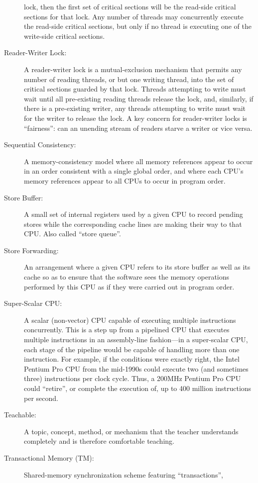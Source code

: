 \begin{description}
	lock, then the first set of critical sections will be the
	read-side critical sections for that lock.
	Any number of threads may concurrently execute the read-side
	critical sections, but only if no thread is executing one of
	the write-side critical sections.
\item[Reader-Writer Lock:]
	A reader-writer lock is a mutual-exclusion mechanism that
	permits any number of reading
	threads, or but one writing thread, into the set of critical
	sections guarded by that lock.
	Threads attempting to write must wait until all pre-existing
	reading threads release the lock, and, similarly, if there
	is a pre-existing writer, any threads attempting to write must
	wait for the writer to release the lock.
	A key concern for reader-writer locks is ``fairness'':
	can an unending stream of readers starve a writer or vice versa.
\item[Sequential Consistency:]
	A memory-consistency model where all memory references appear to occur
	in an order consistent with
	a single global order, and where each CPU's memory references
	appear to all CPUs to occur in program order.
\item[Store Buffer:]
	A small set of internal registers used by a given CPU
	to record pending stores
	while the corresponding cache lines are making their
	way to that CPU.
	Also called ``store queue''.
\item[Store Forwarding:]
	An arrangement where a given CPU refers to its store buffer
	as well as its cache so as to ensure that the software sees
	the memory operations performed by this CPU as if they
	were carried out in program order.
\item[Super-Scalar CPU:]
	A scalar (non-vector) CPU capable of executing multiple instructions
	concurrently.
	This is a step up from a pipelined CPU that executes multiple
	instructions in an assembly-line fashion---in a super-scalar
	CPU, each stage of the pipeline would be capable of handling
	more than one instruction.
	For example, if the conditions were exactly right,
	the Intel Pentium Pro CPU from the mid-1990s could
	execute two (and sometimes three) instructions per clock cycle.
	Thus, a 200MHz Pentium Pro CPU could ``retire'', or complete the
	execution of, up to 400 million instructions per second.
\item[Teachable:]
	A topic, concept, method, or mechanism that the teacher understands
	completely and is therefore comfortable teaching.
\item[Transactional Memory (TM):]
	Shared-memory synchronization scheme featuring ``transactions'',

\end{description}
